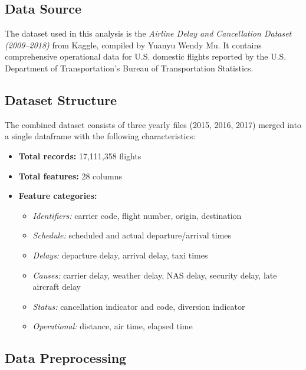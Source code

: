 \documentclass[12pt,a4paper]{article}
\begin{document}
\subsection{Data Source}

The dataset used in this analysis is the \textit{Airline Delay and Cancellation Dataset (2009--2018)} from Kaggle, compiled by Yuanyu Wendy Mu. It contains comprehensive operational data for U.S. domestic flights reported by the U.S. Department of Transportation's Bureau of Transportation Statistics.

\subsection{Dataset Structure}

The combined dataset consists of three yearly files (2015, 2016, 2017) merged into a single dataframe with the following characteristics:

\begin{itemize}
    \item \textbf{Total records:} 17,111,358 flights
    \item \textbf{Total features:} 28 columns
    \item \textbf{Feature categories:}
    \begin{itemize}
        \item \textit{Identifiers:} carrier code, flight number, origin, destination
        \item \textit{Schedule:} scheduled and actual departure/arrival times
        \item \textit{Delays:} departure delay, arrival delay, taxi times
        \item \textit{Causes:} carrier delay, weather delay, NAS delay, security delay, late aircraft delay
        \item \textit{Status:} cancellation indicator and code, diversion indicator
        \item \textit{Operational:} distance, air time, elapsed time
    \end{itemize}
\end{itemize}

\subsection{Data Preprocessing}
\end{document}
